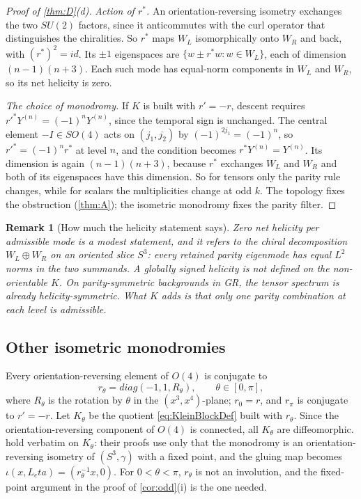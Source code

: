 \documentclass[11pt]{article}
\theoremstyle{canonmath}
\newtheorem{remark}[theorem]{Remark}
\theoremstyle{canonpostulate}
\theoremstyle{canonproposition}
\theoremstyle{canonmath}
\theoremstyle{canonproposition}
\providecommand{\Klein}{\mathcal{K}}
\providecommand{\id}{\mathrm{id}}
\def\mathrm#1{#1}%
\def\mathcal#1{#1}%
\def\eta{eta}%
\begin{document}
\begin{proof}[Proof of \cref{thm:D}(d)]
\emph{Action of $r^*$.} An orientation-reversing isometry exchanges the two $SU(2)$ factors, since it anticommutes with the curl operator that distinguishes the chiralities. So $r^*$ maps $W_L$ isomorphically onto $W_R$ and back, with $(r^*)^2 = \id$. Its $\pm1$ eigenspaces are $\{w\pm r^*w : w\in W_L\}$, each of dimension $(n-1)(n+3)$. Each such mode has equal-norm components in $W_L$ and $W_R$, so its net helicity is zero.

\emph{The choice of monodromy.} If $\Klein$ is built with $r' = -r$, descent requires $r'^*Y^{(n)} = (-1)^nY^{(n)}$, since the temporal sign is unchanged. The central element $-I\in SO(4)$ acts on $(j_1,j_2)$ by $(-1)^{2j_1} = (-1)^n$, so $r'^* = (-1)^nr^*$ at level $n$, and the condition becomes $r^*Y^{(n)} = Y^{(n)}$. Its dimension is again $(n-1)(n+3)$, because $r^*$ exchanges $W_L$ and $W_R$ and both of its eigenspaces have this dimension. So for tensors only the parity rule changes, while for scalars the multiplicities change at odd $k$. The topology fixes the obstruction (\cref{thm:A}); the isometric monodromy fixes the parity filter.
\end{proof}

\begin{remark}[How much the helicity statement says]
Zero net helicity per admissible mode is a modest statement, and it refers to the chiral decomposition $W_L\oplus W_R$ on an oriented slice $S^3$: every retained parity eigenmode has equal $L^2$ norms in the two summands. A globally signed helicity is not defined on the non-orientable $\Klein$. On parity-symmetric backgrounds in GR, the tensor spectrum is already helicity-symmetric. What $\Klein$ adds is that only one parity combination at each level is admissible.
\end{remark}

\subsection{Other isometric monodromies}

Every orientation-reversing element of $\mathrm{O}(4)$ is conjugate to
\[
r_\theta = \mathrm{diag}(-1,1,R_\theta), \qquad \theta\in[0,\pi],
\]
where $R_\theta$ is the rotation by $\theta$ in the $(x^3,x^4)$-plane; $r_0 = r$, and $r_\pi$ is conjugate to $r' = -r$. Let $\Klein_\theta$ be the quotient \eqref{eq:KleinBlockDef} built with $r_\theta$. Since the orientation-reversing component of $\mathrm{O}(4)$ is connected, all $\Klein_\theta$ are diffeomorphic.  hold verbatim on $\Klein_\theta$: their proofs use only that the monodromy is an orientation-reversing isometry of $(S^3,\gamma)$ with a fixed point, and the gluing map becomes $\iota(x,L_\eta) = (r_\theta^{-1}x,0)$. For $0<\theta<\pi$, $r_\theta$ is not an involution, and the fixed-point argument in the proof of \cref{cor:odd}(i) is the one needed.
\end{document}
